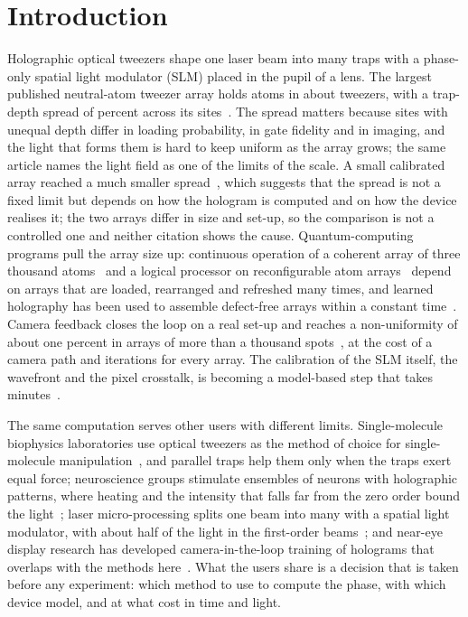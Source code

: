 
\section{Introduction}\label{sec:intro}

Holographic optical tweezers shape one laser beam into many traps with a phase-only spatial light modulator (SLM) placed in the pupil of a lens. The largest published neutral-atom tweezer array holds \execAtoms{} atoms in about \execTweezers{} tweezers, with a trap-depth spread of \execSpread{} percent across its sites~\cite{manetsch}. The spread matters because sites with unequal depth differ in loading probability, in gate fidelity and in imaging, and the light that forms them is hard to keep uniform as the array grows; the same article names the light field as one of the limits of the scale. A small calibrated array reached a much smaller spread~\cite{ultraprecise}, which suggests that the spread is not a fixed limit but depends on how the hologram is computed and on how the device realises it; the two arrays differ in size and set-up, so the comparison is not a controlled one and neither citation shows the cause. Quantum-computing programs pull the array size up: continuous operation of a coherent array of three thousand atoms~\cite{continuous3000} and a logical processor on reconfigurable atom arrays~\cite{logical} depend on arrays that are loaded, rearranged and refreshed many times, and learned holography has been used to assemble defect-free arrays within a constant time~\cite{airearr}. Camera feedback closes the loop on a real set-up and reaches a non-uniformity of about one percent in arrays of more than a thousand spots~\cite{feedbackeq}, at the cost of a camera path and iterations for every array. The calibration of the SLM itself, the wavefront and the pixel crosstalk, is becoming a model-based step that takes minutes~\cite{slmcal}.

The same computation serves other users with different limits. Single-molecule biophysics laboratories use optical tweezers as the method of choice for single-molecule manipulation~\cite{tweezerbio}, and parallel traps help them only when the traps exert equal force; neuroscience groups stimulate ensembles of neurons with holographic patterns, where heating and the intensity that falls far from the zero order bound the light~\cite{neuralens}; laser micro-processing splits one beam into many with a spatial light modulator, with about half of the light in the first-order beams~\cite{machining}; and near-eye display research has developed camera-in-the-loop training of holograms that overlaps with the methods here~\cite{neuralholo}. What the users share is a decision that is taken before any experiment: which method to use to compute the phase, with which device model, and at what cost in time and light.

